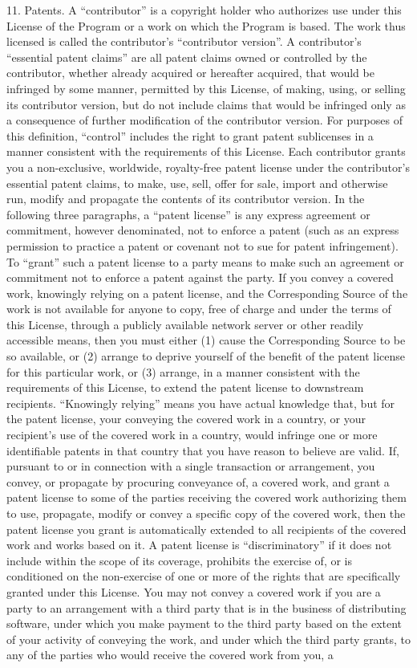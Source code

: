\documentclass {scrbook}
\begin{document}
\begin{tiny}
11. Patents. A ``contributor'' is a copyright holder who authorizes use under this License of the Program or a work on which the Program is based. The work thus licensed is called the contributor's ``contributor version''. A contributor's ``essential patent claims'' are all patent claims owned or controlled by the contributor, whether already acquired or hereafter acquired, that would be infringed by some manner, permitted by this License, of making, using, or selling its contributor version, but do not include claims that would be infringed only as a consequence of further modification of the contributor version. For purposes of this definition, ``control'' includes the right to grant patent sublicenses in a manner consistent with the requirements of this License. Each contributor grants you a non-exclusive, worldwide, royalty-free patent license under the contributor's essential patent claims, to make, use, sell, offer for sale, import and otherwise run, modify and propagate the contents of its contributor version. In the following three paragraphs, a ``patent license'' is any express agreement or commitment, however denominated, not to enforce a patent (such as an express permission to practice a patent or covenant not to sue for patent infringement). To ``grant'' such a patent license to a party means to make such an agreement or commitment not to enforce a patent against the party. If you convey a covered work, knowingly relying on a patent license, and the Corresponding Source of the work is not available for anyone to copy, free of charge and under the terms of this License, through a publicly available network server or other readily accessible means, then you must either (1) cause the Corresponding Source to be so available, or (2) arrange to deprive yourself of the benefit of the patent license for this particular work, or (3) arrange, in a manner consistent with the requirements of this License, to extend the patent license to downstream recipients. ``Knowingly relying'' means you have actual knowledge that, but for the patent license, your conveying the covered work in a country, or your recipient's use of the covered work in a country, would infringe one or more identifiable patents in that country that you have reason to believe are valid. If, pursuant to or in connection with a single transaction or arrangement, you convey, or propagate by procuring conveyance of, a covered work, and grant a patent license to some of the parties receiving the covered work authorizing them to use, propagate, modify or convey a specific copy of the covered work, then the patent license you grant is automatically extended to all recipients of the covered work and works based on it. A patent license is ``discriminatory'' if it does not include within the scope of its coverage, prohibits the exercise of, or is conditioned on the non-exercise of one or more of the rights that are specifically granted under this License. You may not convey a covered work if you are a party to an arrangement with a third party that is in the business of distributing software, under which you make payment to the third party based on the extent of your activity of conveying the work, and under which the third party grants, to any of the parties who would receive the covered work from you, a 
\end{tiny}
\end{document}
